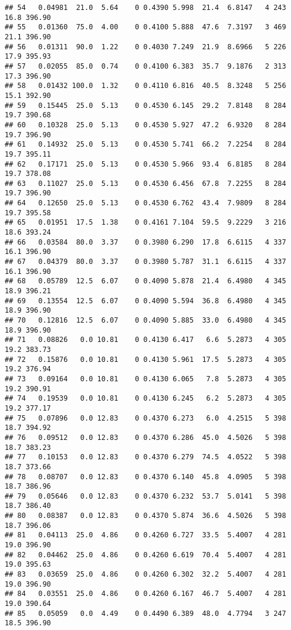 \documentclass[
]{article}
\begin{document}
\begin{verbatim}
## 54   0.04981  21.0  5.64    0 0.4390 5.998  21.4  6.8147   4 243    16.8 396.90
## 55   0.01360  75.0  4.00    0 0.4100 5.888  47.6  7.3197   3 469    21.1 396.90
## 56   0.01311  90.0  1.22    0 0.4030 7.249  21.9  8.6966   5 226    17.9 395.93
## 57   0.02055  85.0  0.74    0 0.4100 6.383  35.7  9.1876   2 313    17.3 396.90
## 58   0.01432 100.0  1.32    0 0.4110 6.816  40.5  8.3248   5 256    15.1 392.90
## 59   0.15445  25.0  5.13    0 0.4530 6.145  29.2  7.8148   8 284    19.7 390.68
## 60   0.10328  25.0  5.13    0 0.4530 5.927  47.2  6.9320   8 284    19.7 396.90
## 61   0.14932  25.0  5.13    0 0.4530 5.741  66.2  7.2254   8 284    19.7 395.11
## 62   0.17171  25.0  5.13    0 0.4530 5.966  93.4  6.8185   8 284    19.7 378.08
## 63   0.11027  25.0  5.13    0 0.4530 6.456  67.8  7.2255   8 284    19.7 396.90
## 64   0.12650  25.0  5.13    0 0.4530 6.762  43.4  7.9809   8 284    19.7 395.58
## 65   0.01951  17.5  1.38    0 0.4161 7.104  59.5  9.2229   3 216    18.6 393.24
## 66   0.03584  80.0  3.37    0 0.3980 6.290  17.8  6.6115   4 337    16.1 396.90
## 67   0.04379  80.0  3.37    0 0.3980 5.787  31.1  6.6115   4 337    16.1 396.90
## 68   0.05789  12.5  6.07    0 0.4090 5.878  21.4  6.4980   4 345    18.9 396.21
## 69   0.13554  12.5  6.07    0 0.4090 5.594  36.8  6.4980   4 345    18.9 396.90
## 70   0.12816  12.5  6.07    0 0.4090 5.885  33.0  6.4980   4 345    18.9 396.90
## 71   0.08826   0.0 10.81    0 0.4130 6.417   6.6  5.2873   4 305    19.2 383.73
## 72   0.15876   0.0 10.81    0 0.4130 5.961  17.5  5.2873   4 305    19.2 376.94
## 73   0.09164   0.0 10.81    0 0.4130 6.065   7.8  5.2873   4 305    19.2 390.91
## 74   0.19539   0.0 10.81    0 0.4130 6.245   6.2  5.2873   4 305    19.2 377.17
## 75   0.07896   0.0 12.83    0 0.4370 6.273   6.0  4.2515   5 398    18.7 394.92
## 76   0.09512   0.0 12.83    0 0.4370 6.286  45.0  4.5026   5 398    18.7 383.23
## 77   0.10153   0.0 12.83    0 0.4370 6.279  74.5  4.0522   5 398    18.7 373.66
## 78   0.08707   0.0 12.83    0 0.4370 6.140  45.8  4.0905   5 398    18.7 386.96
## 79   0.05646   0.0 12.83    0 0.4370 6.232  53.7  5.0141   5 398    18.7 386.40
## 80   0.08387   0.0 12.83    0 0.4370 5.874  36.6  4.5026   5 398    18.7 396.06
## 81   0.04113  25.0  4.86    0 0.4260 6.727  33.5  5.4007   4 281    19.0 396.90
## 82   0.04462  25.0  4.86    0 0.4260 6.619  70.4  5.4007   4 281    19.0 395.63
## 83   0.03659  25.0  4.86    0 0.4260 6.302  32.2  5.4007   4 281    19.0 396.90
## 84   0.03551  25.0  4.86    0 0.4260 6.167  46.7  5.4007   4 281    19.0 390.64
## 85   0.05059   0.0  4.49    0 0.4490 6.389  48.0  4.7794   3 247    18.5 396.90

\end{verbatim}
\end{document}
